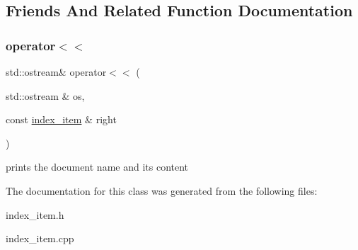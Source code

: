 \subsection{Friends And Related Function Documentation}
\mbox{\label{classindex__item_a27bd13f3db83c91ed012784e4f667822}} 
\subsubsection{\texorpdfstring{operator$<$$<$}{operator<<}}
{\footnotesize\ttfamily std\+::ostream\& operator$<$$<$ (\begin{DoxyParamCaption}\item[{std\+::ostream \&}]{os,  }\item[{const \hyperlink{classindex__item}{index\+\_\+item} \&}]{right }\end{DoxyParamCaption})\hspace{0.3cm}{\ttfamily [friend]}}

prints the document name and its content 

The documentation for this class was generated from the following files\+:\begin{DoxyCompactItemize}
\item 
index\+\_\+item.\+h\item 
index\+\_\+item.\+cpp\end{DoxyCompactItemize}
